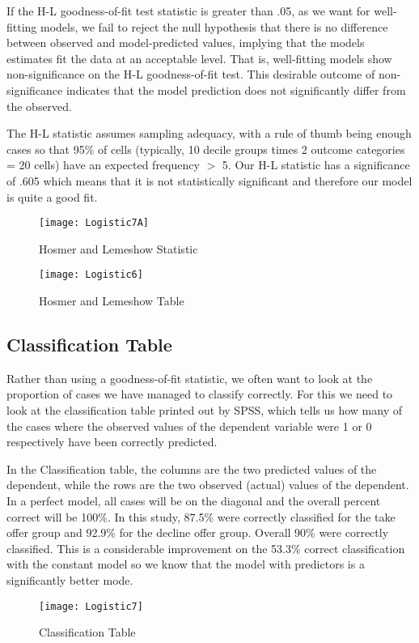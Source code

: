 \documentclass[a4paper,12pt]{article}
\begin{document}
If the H-L goodness-of-fit test statistic is greater than .05, as we want for well-fitting models, we fail to reject the null hypothesis that there is no difference between observed and model-predicted values, implying that the models estimates fit the data at an acceptable level. That is, well-fitting models show non-significance on the
H-L goodness-of-fit test. This desirable outcome of non-significance indicates that the
model prediction does not significantly differ from the observed.

The H-L statistic assumes sampling adequacy, with a rule of thumb being enough cases so that 95\% of cells (typically, 10 decile groups times 2 outcome categories = 20 cells) have an expected frequency $>$ 5. Our H-L statistic has a significance of .605 which means that it is not statistically significant and therefore our model is quite a
good fit.
\begin{figure}[h!]
\begin{center}
  \texttt{[image: Logistic7A]}\\
  \caption{Hosmer and Lemeshow Statistic}
\end{center}
\end{figure}

\begin{figure}[h!]
\begin{center}
  \texttt{[image: Logistic6]}\\
  \caption{Hosmer and Lemeshow Table}
\end{center}
\end{figure}
\newpage
\subsection{Classification Table}
Rather than using a goodness-of-fit statistic, we often want to look at the proportion of cases we have managed to classify correctly. For this we need to look at the classification table printed out by SPSS, which tells us how many of the cases where the observed values of the dependent variable were 1 or 0 respectively have
been correctly predicted.

In the Classification table, the columns are the two predicted values of the dependent, while the rows are the two observed (actual) values of the dependent. In a perfect model, all cases will be on the diagonal and the
overall percent correct will be 100\%. In this study, 87.5\% were correctly classified for the take offer group and 92.9\% for the decline offer group. Overall 90\% were correctly classified. This is a considerable improvement on the 53.3\% correct classification with the constant model so we know that the model with predictors is a significantly better mode.
\begin{figure}[h!]
\begin{center}
  \texttt{[image: Logistic7]}\\
  \caption{Classification Table}
\end{center}
\end{figure}
\end{document}
